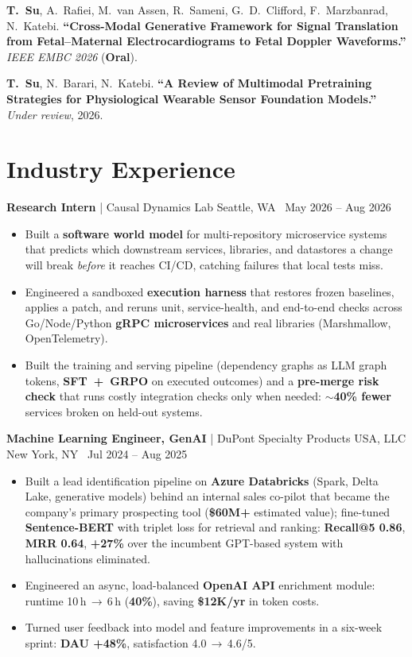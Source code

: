 \documentclass[letterpaper,10pt]{article}
\newcommand{\role}[4]{%
  \textbf{#1} \textnormal{|} #2 \hfill #3\par\vspace{-1pt}
}
\begin{document}
\begin{enumerate}[leftmargin=1.3em, itemsep=2pt, topsep=0pt, parsep=0pt, label={[\arabic*]}]
  \item \textbf{T.~Su}, A.~Rafiei, M.~van Assen, R.~Sameni, G.~D.~Clifford, F.~Marzbanrad, N.~Katebi. \textbf{``Cross-Modal Generative
  Framework for Signal Translation from Fetal--Maternal Electrocardiograms to Fetal Doppler Waveforms.''}
  \textit{IEEE EMBC 2026} (\textbf{Oral}).

  \item \textbf{T.~Su}, N.~Barari, N.~Katebi. \textbf{``A Review of Multimodal Pretraining Strategies for Physiological Wearable Sensor
  Foundation Models.''} \textit{Under review}, 2026.
\end{enumerate}

\section{Industry Experience}
\role{Research Intern}{Causal Dynamics Lab}{Seattle, WA \textbar\ May 2026 -- Aug 2026}{}
\begin{itemize}
  \item Built a \textbf{software world model} for multi-repository microservice systems that predicts which downstream services, libraries, and
  datastores a change will break \textit{before} it reaches CI/CD, catching failures that local tests miss.
  \item Engineered a sandboxed \textbf{execution harness} that restores frozen baselines, applies a patch, and reruns unit, service-health, and
  end-to-end checks across Go/Node/Python \textbf{gRPC microservices} and real libraries (Marshmallow, OpenTelemetry).
  \item Built the training and serving pipeline (dependency graphs as LLM graph tokens, \textbf{SFT~+~GRPO} on executed outcomes) and a
  \textbf{pre-merge risk check} that runs costly integration checks only when needed: \textbf{$\sim$40\% fewer} services broken on held-out systems.
\end{itemize}
\vspace{3pt}

\role{Machine Learning Engineer, GenAI}{DuPont Specialty Products USA, LLC}{New York, NY \textbar\ Jul 2024 -- Aug 2025}{}
\begin{itemize}
  \item Built a lead identification pipeline on \textbf{Azure Databricks} (Spark, Delta Lake, generative models) behind an internal sales co-pilot that
  became the company's primary prospecting tool (\textbf{\$60M+} estimated value); fine-tuned \textbf{Sentence-BERT} with triplet loss for retrieval and
  ranking: \textbf{Recall@5 0.86}, \textbf{MRR 0.64}, \textbf{+27\%} over the incumbent GPT-based system with hallucinations eliminated.
  \item Engineered an async, load-balanced \textbf{OpenAI API} enrichment module: runtime 10\,h\,$\rightarrow$\,6\,h (\textbf{40\%}), saving \textbf{\$12K/yr} in token costs.
  \item Turned user feedback into model and feature improvements in a six-week sprint: \textbf{DAU +48\%}, satisfaction 4.0\,$\rightarrow$\,4.6/5.
\end{itemize}
\end{document}

